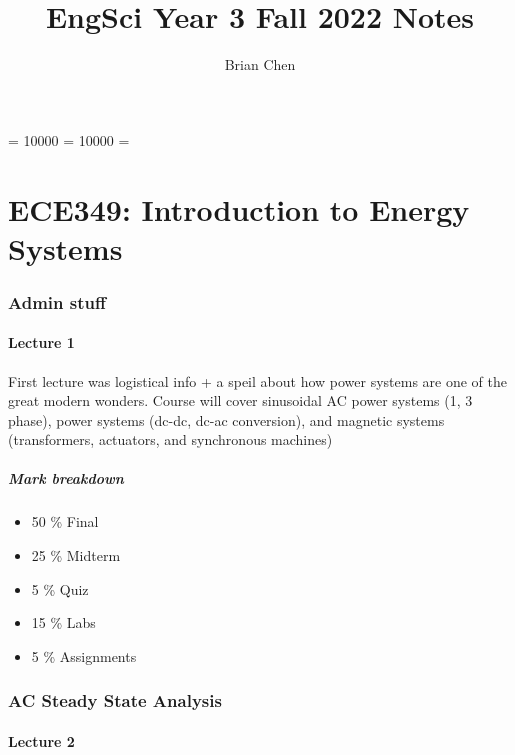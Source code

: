 \documentclass[10pt]{article}
\begin{document}
\hbadness= 10000
\vbadness= 10000
\hfuzz=\maxdimen {}

\title{EngSci Year 3 Fall 2022 Notes}
\author{Brian Chen}
\maketitle
\newpage
\pagestyle{fancynotes}


\part{ECE349: Introduction to Energy Systems}

\section{Admin stuff}
\subsection{Lecture 1}
First lecture was logistical info + a speil about how power systems are one of the great modern wonders. Course will cover sinusoidal AC power systems (1, 3 phase), power systems (dc-dc, dc-ac conversion), and magnetic systems (transformers, actuators, and synchronous machines)

\subsubsection{Mark breakdown}

\begin{itemize}
	\item 50 \% Final
	\item 25 \% Midterm
	\item 5 \% Quiz
	\item 15 \% Labs
	\item 5 \% Assignments
\end{itemize}



\section{AC Steady State Analysis}
\subsection{Lecture 2}
\end{document}
